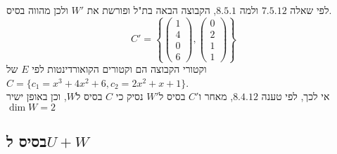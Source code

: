 \documentclass{article}
\begin{document}
לפי שאלה $7.5.12$ ולמה $8.5.1$, הקבוצה הבאה בת"ל ופורשת את $W'$ ולכן מהווה בסיס.
\[
    C'=\left\{
    \begin{pmatrix}
        1 \\
        4 \\
        0 \\
        6
    \end{pmatrix},
    \begin{pmatrix}
        0 \\
        2 \\
        1 \\
        1
    \end{pmatrix}
    \right\}
\]
וקטורי הקבוצה הם וקטורים הקואורדינטות לפי $E$ של $C=\{ c_1=x^3+4x^2+6, c_2=2x^2+x+1 \}$.\\
אי לכך, לפי טענה $8.4.12$, מאחר ו$C'$ בסיס ל$W'$ נסיק כי $C$ בסיס ל$W$,
וכן באופן ישיר $\dim W=2$

\subsection*{בסיס ל$U+W$}
\end{document}
